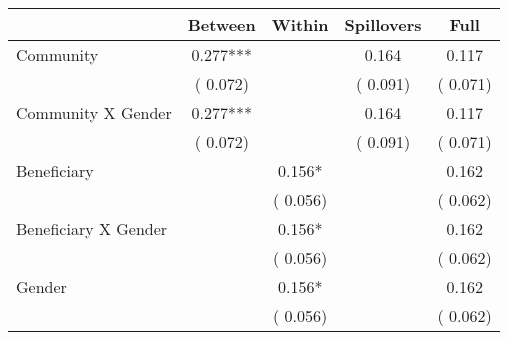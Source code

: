 
\begin{tabular}{l*{4}{c}}\hline&\multicolumn{1}{c}{Between}&\multicolumn{1}{c}{Within}&\multicolumn{1}{c}{Spillovers}&\multicolumn{1}{c}{Full}\\ \hline
 Community                                     &              0.277***      &                                               &        0.164 &         0.117                            \\ 
                                                       &        (       0.072)           &                                       &       (       0.091)     &      (       0.071)                                           \\ 
 Community X Gender            &              0.277***      &                                               &        0.164 &         0.117                            \\ 
                                                       &        (       0.072)           &                                       &       (       0.091)     &      (       0.071)                                           \\ 
 Beneficiary                           &                                               &        0.156*    &                                &             0.162                            \\ 
                                                       &                                               & (       0.056)                  &                                        &      (       0.062)                                           \\ 
 Beneficiary X Gender          &                                               &        0.156*    &                                &             0.162                            \\ 
                                                       &                                               & (       0.056)                  &                                        &      (       0.062)                                           \\ 
 Gender                                        &                              &        0.156*    &                                &             0.162                            \\ 
                                                       &                                               & (       0.056)                  &                                        &      (       0.062)                                           \\ 

\end{tabular}
